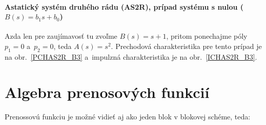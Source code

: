 \documentclass[a4paper, 10pt, ]{article}
\begin{document}
\paragraph{Astatický systém druhého rádu (AS2R), prípad systému s nulou ($B(s) = b_1 s + b_0$)}

Azda len pre zaujímavosť tu zvoľme $B(s) =  s + 1$, pritom ponechajme póly $p_1 = 0$ a~$p_2 = 0$, teda $A(s) = s^2$.  Prechodová charakteristika pre tento prípad je na obr.~\ref{PCHAS2R_B3} a~impulzná charakteristika je na obr.~\ref{ICHAS2R_B3}.

\begin{center}


	\label{PCHAS2R_B3}

\end{center}

\begin{center}


	\label{ICHAS2R_B3}

\end{center}











\pagebreak

\section{Algebra prenosových funkcií}

Prenossovú funkciu je možné vidieť aj ako jeden blok v blokovej schéme, teda:


\begin{center}

    \makebox[\textwidth][c]{%
    
    }

	\label{TFalgebra_lenG}

\end{center}
\end{document}
